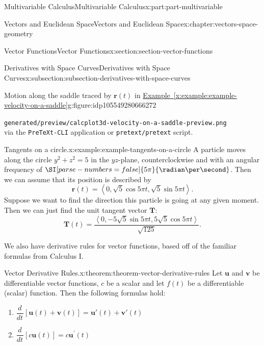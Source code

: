\documentclass[twoside,10pt,]{book}
\newcommand{\xreffont}{\relax}
\newcommand{\mono}[1]{\texttt{#1}}
\numberwithin{equation}{part}
\newlength{\qrsize}
\newlength{\previewwidth}
\newcommand{\vb}[1]{\mathbf{#1}}
\newcommand{\dv}[3][]{\dfrac{d^{#1} #2}{d #3^{#1}}}
\newcommand{\dotprod}[1]{\left\langle #1 \right\rangle}
\begin{document}
\begin{partptx}{Multivariable Calculus}{}{Multivariable Calculus}{}{}{x:part:part-multivariable}
\begin{chapterptx}{Vectors and Euclidean Space}{}{Vectors and Euclidean Space}{}{}{x:chapter:vectors-space-geometry}
\begin{sectionptx}{Vector Functions}{}{Vector Functions}{}{}{x:section:section-vector-functions}
\begin{subsectionptx}{Derivatives with Space Curves}{}{Derivatives with Space Curves}{}{}{x:subsection:subsection-derivatives-with-space-curves}
\begin{figureptx}{Motion along the saddle traced by \(\vb{r}(t)\) in \hyperref[x:example:example-velocity-on-a-saddle]{Example~{\xreffont\ref{x:example:example-velocity-on-a-saddle}}}}{g:figure:idp105549280666272}{}
\begin{tcbraster}[raster columns=2, raster column skip=1pt, raster halign=center, raster force size=false, raster left skip=0pt, raster right skip=0pt]
\begin{tcolorbox}[previewstyle, width=\previewwidth]
{\mono{generated/preview/calcplot3d-velocity-on-a-saddle-preview.png}\\%
via the \mono{PreTeXt-CLI} application or \mono{pretext/pretext} script.}%
\end{tcolorbox}%
\begin{tcolorbox}[qrstyle]%
{\hypersetup{urlcolor=black}}%
\end{tcolorbox}%
\end{tcbraster}%
\tcblower
\end{figureptx}%
\begin{example}{Tangents on a circle.}{x:example:example-tangents-on-a-circle}%
A particle moves along the circle \(y^{2}+z^{2}=5\) in the \(yz\)-plane, counterclockwise and with an angular frequency of $\SI[parse-numbers=false]{5\pi}{\radian\per\second}$. Then we can assume that its position is described by%
%
\begin{equation*}
\mathbf{r}(t) = \dotprod{0,\sqrt{5}\cos5\pi t, \sqrt{5}\sin5\pi t}.
\end{equation*}
Suppose we want to find the direction this particle is going at any given moment. Then we can just find the unit tangent vector \(\mathbf{T}\):%
%
\begin{equation*}
\mathbf{T}(t) = \frac{\dotprod{0,-5\sqrt{5}\sin5\pi t, 5\sqrt{5}\cos5\pi t}}{\sqrt{125}}.
\end{equation*}
\end{example}
We also have derivative rules for vector functions, based off of the familiar formulas from Calculus I.%
\begin{theorem}{Vector Derivative Rules.}{}{x:theorem:theorem-vector-derivative-rules}%
%
Let \(\mathbf{u}\) and \(\mathbf{v}\) be differentiable vector functions, \(c\) be a scalar and let \(f(t)\) be a differentiable (scalar) function. Then the following formulas hold:%
%
\begin{enumerate}
\item{}\(\displaystyle \dv{}{t}[\mathbf{u}(t)+\mathbf{v}(t)] = \mathbf{u}'(t)+\mathbf{v}'(t)\)%
\item{}\(\displaystyle \dv{}{t}[c\mathbf{u}(t)] = c\mathbf{u}^{\prime}(t)\)%

\end{enumerate}
\end{theorem}
\end{subsectionptx}
\end{sectionptx}
\end{chapterptx}
\end{partptx}
\end{document}
